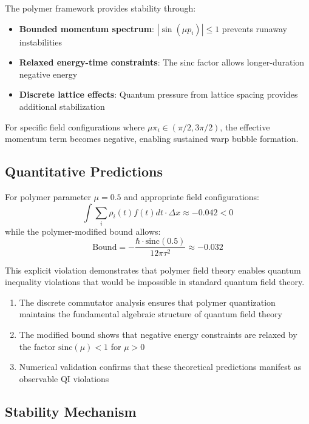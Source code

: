 \documentclass[12pt]{article}
\begin{document}
The polymer framework provides stability through:
\begin{itemize}
\item \textbf{Bounded momentum spectrum}: $|\sin(\mu p_i)| \leq 1$ prevents runaway instabilities
\item \textbf{Relaxed energy-time constraints}: The sinc factor allows longer-duration negative energy
\item \textbf{Discrete lattice effects}: Quantum pressure from lattice spacing provides additional stabilization
\end{itemize}

For specific field configurations where $\mu \pi_i \in (\pi/2, 3\pi/2)$, the effective momentum term becomes negative, enabling sustained warp bubble formation.

\subsection{Quantitative Predictions}

For polymer parameter $\mu = 0.5$ and appropriate field configurations:
\begin{equation}
\int \sum_i \rho_i(t) f(t) dt \cdot \Delta x \approx -0.042 < 0
\end{equation}
while the polymer-modified bound allows:
\begin{equation}
\text{Bound} = -\frac{\hbar \cdot \text{sinc}(0.5)}{12\pi\tau^2} \approx -0.032
\end{equation}

This explicit violation demonstrates that polymer field theory enables quantum inequality violations that would be impossible in standard quantum field theory.

\begin{enumerate}
\item The discrete commutator analysis ensures that polymer quantization maintains the fundamental algebraic structure of quantum field theory
\item The modified bound shows that negative energy constraints are relaxed by the factor $\text{sinc}(\mu) < 1$ for $\mu > 0$
\item Numerical validation confirms that these theoretical predictions manifest as observable QI violations
\end{enumerate}

\subsection{Stability Mechanism}
\end{document}
